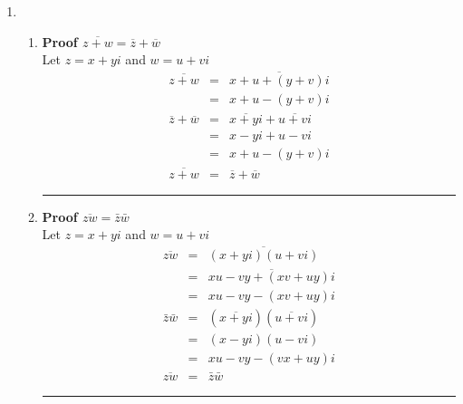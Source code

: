 \documentclass{article}%
\newenvironment{proof}[1][]{\begin{samepage}\textbf{Proof #1} }{\rule{0.5em}{0.5em} \end{samepage}}
\begin{document}
\begin{enumerate}
\begin{enumerate}[label*=\arabic*.]
\begin{enumerate}[label=\alph*]
\begin{proof}[$r(wz)=(rw)z$]
\begin{eqnarray*}
                         &=&pux-pvy-qvx-quy+(puy-qvy+pvx+qux)i \\
                    r(wz)&=&(rw)z 
               \end{eqnarray*}
            \end{proof}
        \end{enumerate}
        \item
        \begin{enumerate}[label=\alph*]
            \item
            \begin{proof}[$\overline{z+w}=\overline{z}+\overline{w}$]
                \\ Let $z=x+yi$ and $w=u+vi$
                \begin{eqnarray*}
                    \overline{z+w}&=&\overline{x+u+(y+v)i} \\
                                  &=&x+u-(y+v)i \\
                    \overline{z}+\overline{w}&=&\overline{x+yi}+\overline{u+vi} \\
                                             &=&x-yi+u-vi \\
                                             &=&x+u-(y+v)i \\
                    \overline{z+w}&=&\overline{z}+\overline{w}
                \end{eqnarray*}
            \end{proof}
            \item
            \begin{proof}[$\overline{zw}=\bar{z}\bar{w}$]
                \\ Let $z=x+yi$ and $w=u+vi$
                \begin{eqnarray*}
                    \overline{zw}&=&\overline{(x+yi)(u+vi)} \\
                                 &=&\overline{xu-vy+(xv+uy)i} \\
                                 &=&xu-vy-(xv+uy)i \\
                    \bar{z}\bar{w}&=&(\overline{x+yi})(\overline{u+vi}) \\
                                  &=&(x-yi)(u-vi) \\
                                  &=&xu-vy-(vx+uy)i \\
                    \overline{zw}&=&\bar{z}\bar{w}
                \end{eqnarray*}
            \end{proof}

\end{enumerate}
\end{enumerate}
\end{enumerate}
\end{document}
